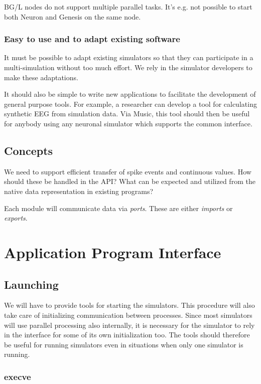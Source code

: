 \documentclass[a4paper]{report}
\begin{document}
BG/L nodes do not support multiple parallel tasks.  It's e.g. not
possible to start both Neuron and Genesis on the same node.


\subsection{Easy to use and to adapt existing software}

It must be possible to adapt existing simulators so that they can
participate in a multi-simulation without too much effort.  We rely in
the simulator developers to make these adaptations.

It should also be simple to write new applications to facilitate the
development of general purpose tools.  For example, a researcher can
develop a tool for calculating synthetic EEG from simulation data.
Via Music, this tool should then be useful for anybody using any
neuronal simulator which supports the common interface.


\section{Concepts}

We need to support efficient transfer of spike events and continuous
values.  How should these be handled in the API?  What can be expected
and utilized from the native data representation in existing programs?

Each module will communicate data via \emph{ports}.  These are either
\emph{imports} or \emph{exports}.


\chapter{Application Program Interface}

\section{Launching}

We will have to provide tools for starting the simulators.  This
procedure will also take care of initializing communication between
processes.  Since most simulators will use parallel processing also
internally, it is necessary for the simulator to rely in the interface
for some of its own initialization too.  The tools should therefore be
useful for running simulators even in situations when only one
simulator is running.


\subsection{execve}
\end{document}

